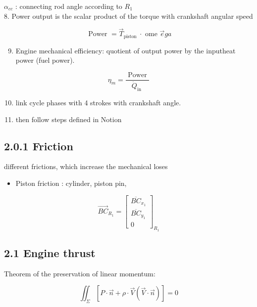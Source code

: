 \documentclass[10pt]{article}
\begin{document}
$\alpha_{c c}$ : connecting rod angle according to $R_{1}$\\
8. Power output is the scalar product of the torque with crankshaft angular speed


\begin{equation*}
\text { Power }=\vec{T}_{\text {piston }} \cdot \text { ome } \vec{e} g a \tag{8}
\end{equation*}


\begin{enumerate}
  \setcounter{enumi}{8}
  \item Engine mechanical efficiency: quotient of output power by the inputheat power (fuel power).
\end{enumerate}


\begin{equation*}
\eta_{m}=\frac{\text { Power }}{\dot{Q}_{\text {in }}} \tag{9}
\end{equation*}


\begin{enumerate}
  \setcounter{enumi}{9}
  \item link cycle phases with 4 strokes with crankshaft angle.
  \item then follow steps defined in Notion
\end{enumerate}

\subsection*{2.0.1 Friction}
different frictions, which increase the mechanical loses

\begin{itemize}
  \item Piston friction : cylinder, piston pin,
\end{itemize}

\[
\overrightarrow{B C}_{R_{1}}=\left[\begin{array}{c}
\overline{B C}_{x_{1}}  \tag{10}\\
\overline{B C}_{y_{1}} \\
0
\end{array}\right]_{R_{1}}
\]

\subsection*{2.1 Engine thrust}
Theorem of the preservation of linear momentum:


\begin{equation*}
\iint_{\Sigma}[P \cdot \vec{n}+\rho \cdot \vec{V}(\vec{V} \cdot \vec{n})]=0 \tag{11}
\end{equation*}
\end{document}
